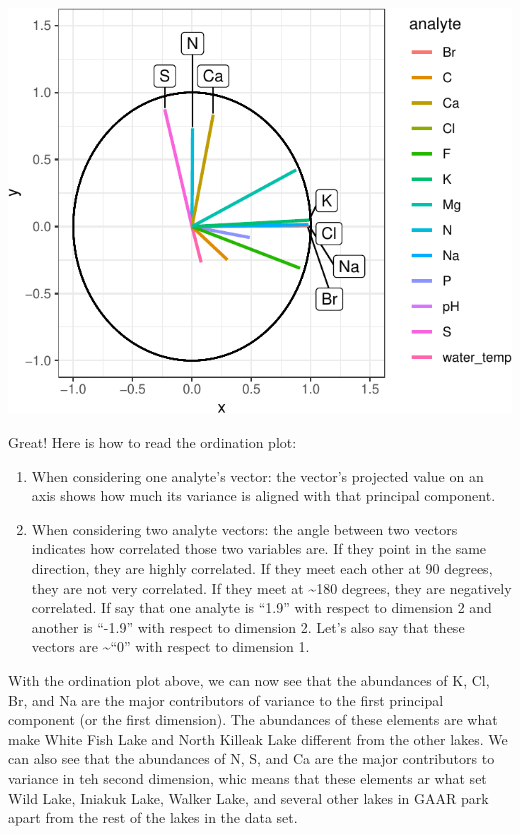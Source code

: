 \documentclass[
]{krantz}
\begin{document}
\begin{center}\includegraphics[width=1\linewidth]{index_files/figure-latex/unnamed-chunk-100-1} \end{center}

Great! Here is how to read the ordination plot:

\begin{enumerate}
\def\labelenumi{\arabic{enumi}.}
\item
  When considering one analyte's vector: the vector's projected value on an axis shows how much its variance is aligned with that principal component.
\item
  When considering two analyte vectors: the angle between two vectors indicates how correlated those two variables are. If they point in the same direction, they are highly correlated. If they meet each other at 90 degrees, they are not very correlated. If they meet at \textasciitilde180 degrees, they are negatively correlated. If say that one analyte is ``1.9'' with respect to dimension 2 and another is ``-1.9'' with respect to dimension 2. Let's also say that these vectors are \textasciitilde{}``0'' with respect to dimension 1.
\end{enumerate}

With the ordination plot above, we can now see that the abundances of K, Cl, Br, and Na are the major contributors of variance to the first principal component (or the first dimension). The abundances of these elements are what make White Fish Lake and North Killeak Lake different from the other lakes. We can also see that the abundances of N, S, and Ca are the major contributors to variance in teh second dimension, whic means that these elements ar what set Wild Lake, Iniakuk Lake, Walker Lake, and several other lakes in GAAR park apart from the rest of the lakes in the data set.
\end{document}
